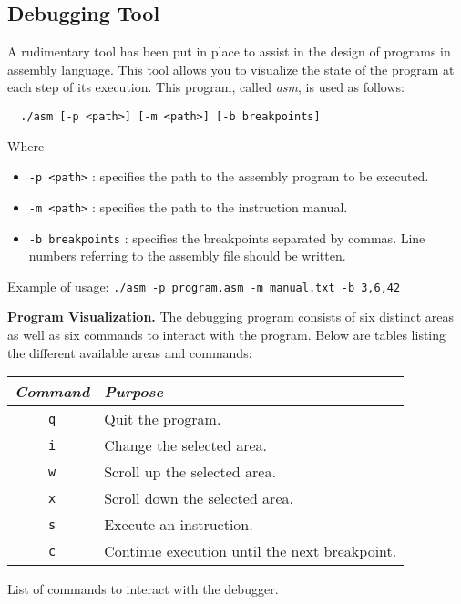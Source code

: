 \subsection*{Debugging Tool}
\noindent
A rudimentary tool has been put in place to assist in the design
of programs in assembly language. This tool allows you to visualize
the state of the program at each step of its execution. This program,
called \emph{asm}, is used as follows:
\begin{verbatim}
  ./asm [-p <path>] [-m <path>] [-b breakpoints]
\end{verbatim}
Where
\begin{itemize}
  \item \texttt{-p <path>} : specifies the path to the assembly 
    program to be executed.
  \item \texttt{-m <path>} : specifies the path to the instruction 
    manual.
  \item \texttt{-b breakpoints} : specifies the breakpoints separated 
    by commas. Line numbers referring to the assembly file should be 
    written.
\end{itemize}
Example of usage:
\verb|./asm -p program.asm -m manual.txt -b 3,6,42|
\medskip

\noindent
\textbf{Program Visualization. } \quad
The debugging program consists of six distinct areas as well 
as six commands to interact with the program. Below are tables listing
the different available areas and commands:

\begin{center}
\begin{tabular}{cl}
  \toprule
  \emph{Command} & \emph{Purpose} \\
  \midrule
  \texttt{q} & Quit the program. \\
  \texttt{i} & Change the selected area. \\
  \texttt{w} & Scroll up the selected area. \\
  \texttt{x} & Scroll down the selected area. \\
  \texttt{s} & Execute an instruction. \\
  \texttt{c} & Continue execution until the next breakpoint. \\
  \bottomrule
\end{tabular} 
\medskip

List of commands to interact with the debugger.
\end{center}
\medskip

